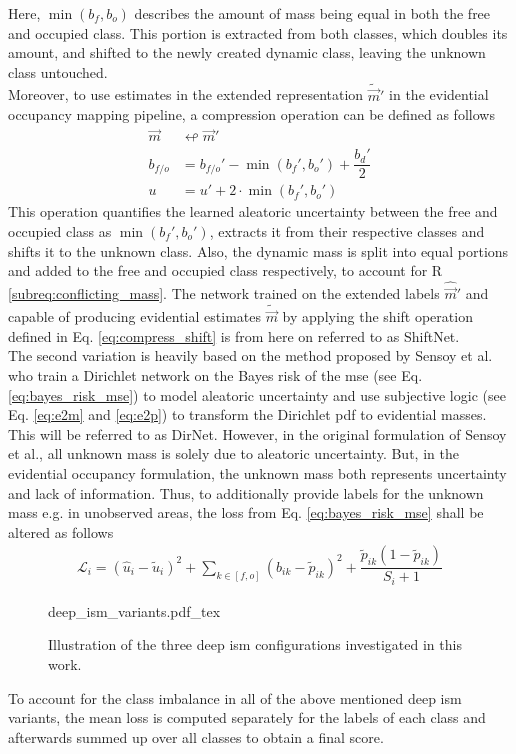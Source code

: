 Here, $\min(b_f,b_o)$ describes the amount of mass being equal in both the free and occupied class. This portion is extracted from both classes, which doubles its amount, and shifted to the newly created dynamic class, leaving the unknown class untouched.\\ 
Moreover, to use estimates in the extended representation $\tilde{\vec{m}}'$ in the evidential occupancy mapping pipeline, a compression operation can be defined as follows
\begin{align}
	\label{eq:compress_shift}
	\vec{m} &\looparrowleft \vec{m}'\\
	b_{f/o} &= b_{f/o}' - \min(b_f',b_o') + \dfrac{b_d'}{2}\\
	u &= u' + 2\cdot\min(b_f',b_o')
\end{align}
This operation quantifies the learned aleatoric uncertainty between the free and occupied class as $\min(b_f',b_o')$, extracts it from their respective classes and shifts it to the unknown class. Also, the dynamic mass is split into equal portions and added to the free and occupied class respectively, to account for R \ref{subreq:conflicting_mass}. The network trained on the extended labels $\hat{\vec{m}}'$ and capable of producing evidential estimates $\tilde{\vec{m}}$ by applying the shift operation defined in Eq. \ref{eq:compress_shift} is from here on referred to as ShiftNet.
\\
The second variation is heavily based on the method proposed by Sensoy et al. \cite{sensoy2018evidential} who train a Dirichlet network on the Bayes risk of the \gls{mse} (see Eq. \ref{eq:bayes_risk_mse}) to model aleatoric uncertainty and use subjective logic (see Eq. \ref{eq:e2m} and \ref{eq:e2p}) to transform the Dirichlet \gls{pdf} to evidential masses. This will be referred to as DirNet. However, in the original formulation of Sensoy et al., all unknown mass is solely due to aleatoric uncertainty. But, in the evidential occupancy formulation, the unknown mass both represents uncertainty and lack of information. Thus, to additionally provide labels for the unknown mass e.g. in unobserved areas, the loss from Eq. \ref{eq:bayes_risk_mse} shall be altered as follows
\begin{align}
	\mathcal{L}_i = (\hat{u}_i-\tilde{u}_{i})^2 + \sum_{k\in [f,o]}(b_{ik}-\tilde{p}_{ik})^2 + \dfrac{\tilde{p}_{ik}(1-\tilde{p}_{ik})}{S_i+1} 
\end{align}
\begin{figure}
	\begin{center}
		{deep_ism_variants.pdf_tex}
		\caption{\label{fig:deep_ism_variants}Illustration of the three deep \gls{ism} configurations investigated in this work.}
	\end{center}
\end{figure}
To account for the class imbalance in all of the above mentioned deep \gls{ism} variants, the mean loss is computed separately for the labels of each class and afterwards summed up over all classes to obtain a final score. 
%
